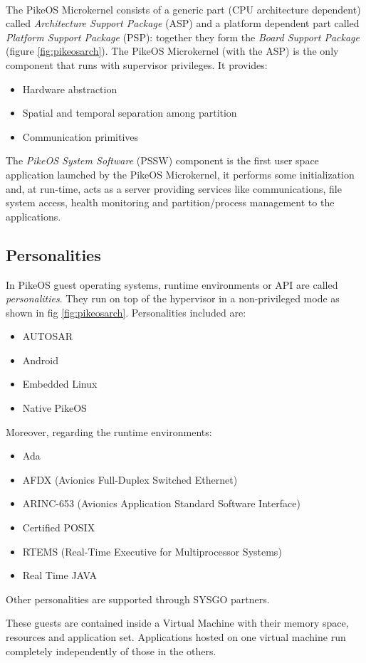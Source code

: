 \paragraph{} The PikeOS Microkernel consists of a generic part (CPU architecture dependent) called \emph{Architecture Support Package} (ASP) and a platform dependent part called \emph{Platform Support Package} (PSP): together they form the \emph{Board Support Package} (figure \ref{fig:pikeosarch}). 
The PikeOS Microkernel (with the ASP) is the only component that runs with supervisor privileges. It provides:
\begin{itemize}
\item Hardware abstraction
\item Spatial and temporal separation among partition
\item Communication primitives
\end{itemize}
The \emph{PikeOS System Software} (PSSW) component is the first user space application launched by the PikeOS Microkernel, it performs some initialization and, at run-time, acts as a server providing services like communications, file system access, health monitoring and partition/process management to the applications.

\subsection{Personalities}
In PikeOS guest operating systems, runtime environments or API are called \emph{personalities}. They run on top of the hypervisor in a non-privileged mode as shown in fig \ref{fig:pikeosarch}. Personalities included are:
\begin{itemize}
\item AUTOSAR
\item Android
\item Embedded Linux
\item Native PikeOS
\end{itemize}
Moreover, regarding the runtime environments:
\begin{itemize}
\item Ada
\item AFDX (Avionics Full-Duplex Switched Ethernet)
\item ARINC-653 (Avionics Application Standard Software Interface)
\item Certified POSIX
\item RTEMS (Real-Time Executive for Multiprocessor Systems)
\item Real Time JAVA
\end{itemize}
Other personalities are supported through SYSGO partners.
\par These guests are contained inside a Virtual Machine with their memory space, resources and application set. Applications hosted on one virtual machine run completely independently of those in the others. 

